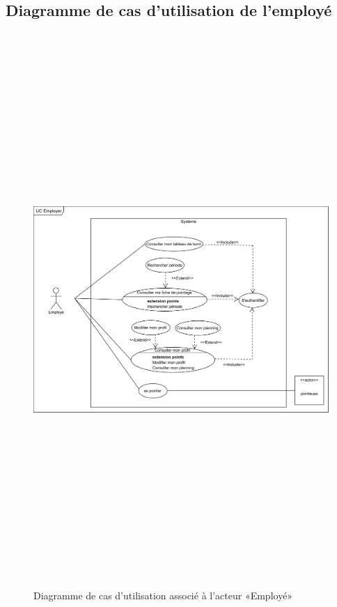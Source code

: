 \clearpage  
\subsection{Diagramme de cas d'utilisation de l'employé}
    \begin{figure}[h!]
        \centering
        \includegraphics[angle=90, height=21cm]{images/uc_employe.png}
        \caption{Diagramme de cas d'utilisation associé à l'acteur «Employé»}
        \label{fig2}
    \end{figure}
    
